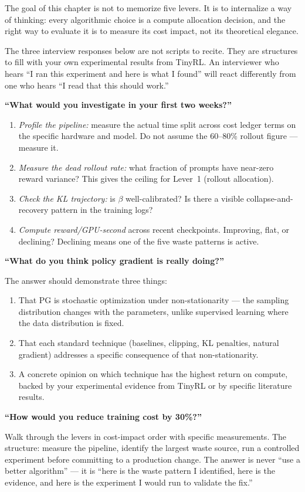 \begin{taste}
The goal of this chapter is not to memorize five levers. It is to internalize a way of thinking: every algorithmic choice is a compute allocation decision, and the right way to evaluate it is to measure its cost impact, not its theoretical elegance.

The three interview responses below are not scripts to recite. They are structures to fill with your own experimental results from TinyRL. An interviewer who hears ``I ran this experiment and here is what I found'' will react differently from one who hears ``I read that this should work.''
\end{taste}

\textbf{``What would you investigate in your first two weeks?''}

\begin{enumerate}
  \item \textit{Profile the pipeline:} measure the actual time split across cost ledger terms on the specific hardware and model. Do not assume the 60--80\% rollout figure --- measure it.
  \item \textit{Measure the dead rollout rate:} what fraction of prompts have near-zero reward variance? This gives the ceiling for Lever~1 (rollout allocation).
  \item \textit{Check the KL trajectory:} is $\beta$ well-calibrated? Is there a visible collapse-and-recovery pattern in the training logs?
  \item \textit{Compute reward/GPU-second} across recent checkpoints. Improving, flat, or declining? Declining means one of the five waste patterns is active.
\end{enumerate}

\textbf{``What do you think policy gradient is really doing?''}

The answer should demonstrate three things:
\begin{enumerate}
  \item That PG is stochastic optimization under non-stationarity --- the sampling distribution changes with the parameters, unlike supervised learning where the data distribution is fixed.
  \item That each standard technique (baselines, clipping, KL penalties, natural gradient) addresses a specific consequence of that non-stationarity.
  \item A concrete opinion on which technique has the highest return on compute, backed by your experimental evidence from TinyRL or by specific literature results.
\end{enumerate}

\textbf{``How would you reduce training cost by 30\%?''}

Walk through the levers in cost-impact order with specific measurements. The structure: measure the pipeline, identify the largest waste source, run a controlled experiment before committing to a production change. The answer is never ``use a better algorithm'' --- it is ``here is the waste pattern I identified, here is the evidence, and here is the experiment I would run to validate the fix.''

\newpage
